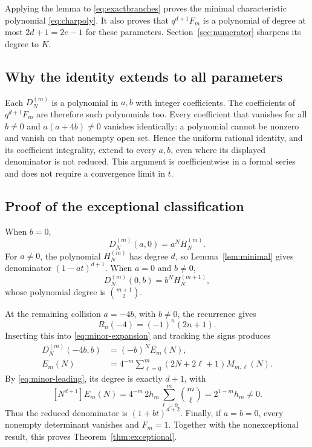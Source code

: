 \documentclass[11pt,a4paper]{article}
\numberwithin{equation}{section}
\theoremstyle{definition}
\theoremstyle{remark}
\newcommand{\D}[2]{D_{#1}^{(#2)}}
\newcommand{\HH}[2]{H_{#1}^{(#2)}}
\begin{document}
Applying the lemma to \eqref{eq:exactbranches} proves the minimal
characteristic polynomial \eqref{eq:charpoly}.  It also proves that
$q^{d+1}F_m$ is a polynomial of degree at most $2d+1=2e-1$ for these
parameters.  Section~\ref{sec:numerator} sharpens its degree to $K$.

\subsection{Why the identity extends to all parameters}
Each $D_N^{(m)}$ is a polynomial in $a,b$ with integer coefficients.
The coefficients of $q^{d+1}F_m$ are therefore such polynomials too.
Every coefficient that vanishes for all $b\ne0$ and $a(a+4b)\ne0$
vanishes identically: a polynomial cannot be nonzero and vanish on
that nonempty open set.  Hence the uniform rational identity,
and its coefficient integrality, extend to every $a,b$, even where
its displayed denominator is not reduced.  This argument is
coefficientwise in a formal series and does not require a convergence
limit in $t$.

\subsection{Proof of the exceptional classification}
When $b=0$,
\begin{equation}\label{eq:bzero}
 \D{N}{m}(a,0)=a^N\HH{N}{m}.
\end{equation}
For $a\ne0$, the polynomial $H_N^{(m)}$ has degree $d$, so
Lemma~\ref{lem:minimal} gives denominator $(1-at)^{d+1}$.
When $a=0$ and $b\ne0$,
\begin{equation}\label{eq:azero}
 \D{N}{m}(0,b)=b^N\HH{N}{m+1},
\end{equation}
whose polynomial degree is $\binom{m+1}{2}$.

At the remaining collision $a=-4b$, with $b\ne0$, the recurrence gives
\begin{equation}\label{eq:Rminus4}
 R_n(-4)=(-1)^n(2n+1).
\end{equation}
Inserting this into \eqref{eq:minor-expansion} and tracking the signs
produces
\begin{align}
 \D{N}{m}(-4b,b)&=(-b)^N E_m(N),\label{eq:endpoint}\\
 E_m(N)&=4^{-m}\sum_{\ell=0}^{m}(2N+2\ell+1)M_{m,\ell}(N).
 \label{eq:E}
\end{align}
By \eqref{eq:minor-leading}, its degree is exactly $d+1$, with
\begin{equation}\label{eq:E-leading}
 [N^{d+1}]E_m(N)=4^{-m}\,2h_m\sum_{\ell=0}^m\binom m\ell
              =2^{1-m}h_m\ne0.
\end{equation}
Thus the reduced denominator is $(1+bt)^{d+2}$.
Finally, if $a=b=0$, every nonempty determinant vanishes and $F_m=1$.
Together with the nonexceptional result, this proves
Theorem~\ref{thm:exceptional}.
\end{document}
